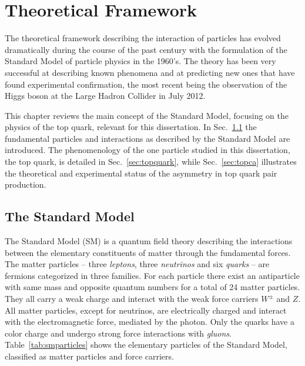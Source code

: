\chapter{Theoretical Framework}
\label{sec:theory}

The theoretical framework describing the interaction of particles has
evolved dramatically during the course of the past century with the
formulation of the Standard Model of particle physics in the
1960's. The theory has been very successful at describing known
phenomena and at predicting new ones that have found experimental
confirmation, the most recent being the observation of the Higgs boson
at the Large Hadron Collider in July 2012.

This chapter reviews the main concept of the Standard Model, focusing
on the physics of the top quark, relevant for this dissertation. In
Sec.~\ref{sec:theSM} the fundamental particles and interactions as
described by the Standard Model are introduced. The phenomenology of
the one particle studied in this dissertation, the top quark, is
detailed in Sec.~\ref{sec:topquark}, while Sec.~\ref{sec:topca}
illustrates the theoretical and experimental status of the asymmetry
in top quark pair production.


\section{The Standard Model}
\label{sec:theSM}

The Standard Model (SM) is a quantum field theory describing the
interactions between the elementary constituents of matter through the
fundamental forces.
The matter particles -- three {\it leptons}, three {\it neutrinos} and six
{\it quarks} -- are fermions categorized in three families. For each particle
there exist an antiparticle with same mass and opposite quantum
numbers for a total of 24 matter particles.
They all carry a weak charge and interact with
the weak force carriers $W^{\pm}$ and $Z$. All matter particles, except for
neutrinos, are electrically charged and interact with the
electromagnetic force, mediated by the photon. Only the quarks have a
color charge and undergo strong force interactions with {\it gluons}.  
Table~\ref{tab:smparticles} shows the elementary particles of the
Standard Model, classified as matter particles and force carriers.

